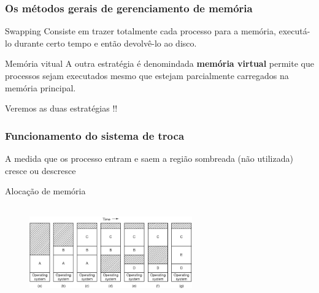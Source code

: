 \documentclass[11pt]{beamer}
\begin{document}
\begin{frame}\frametitle{ Os métodos gerais de gerenciamento de memória}

\begin{block}{ Swapping}
 Consiste em trazer totalmente cada processo para a memória, executá-lo durante certo tempo e então devolvê-lo ao disco.
\end{block}

\pause
\begin{block}{ Memória vitual}
  A outra estratégia é denomindada \textbf{memória virtual} permite que processos sejam executados mesmo que estejam parcialmente 
  carregados na memória principal.
\end{block}

\pause
  Veremos as duas estratégias !!
\end{frame}


\begin{frame}\frametitle{ Funcionamento do sistema de troca}
  A medida que os processo entram e saem a região sombreada (não utilizada) cresce ou descresce
\pause
\begin{exampleblock}{ Alocação de memória}
\pause
  \begin{figure}[h]
    \includegraphics[width=70mm, height=40mm]{Figuras/alocacaoSemPilha.png}\\
  \end{figure}

\end{exampleblock}
  
\end{frame}
\end{document}
